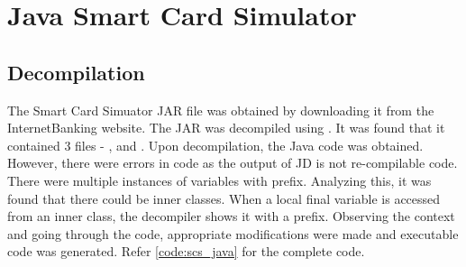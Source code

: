 \section{Java Smart Card Simulator}

\subsection{Decompilation}
The Smart Card Simuator JAR file was obtained by downloading it from the InternetBanking website. The JAR was decompiled using . It was found that it contained 3 files - ,  and . Upon decompilation, the Java code was obtained. However, there were errors in code as the output of JD is not re-compilable code. There were multiple instances of variables with  prefix. Analyzing this, it was found that there could be inner classes. When a local final variable is accessed from an inner class, the decompiler shows it with a  prefix.
Observing the context and going through the code, appropriate modifications were made and executable code was generated. Refer \ref{code:scs_java} for the complete code.

